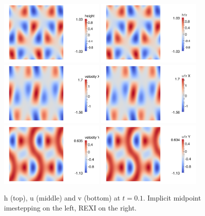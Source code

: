 \documentclass[14pt]{article}
\begin{document}
\begin{figure}
  \centering
  \includegraphics[width=0.45\textwidth]{results/t0.1/IM_h}
  \includegraphics[width=0.45\textwidth]{results/t0.1/REXI_h}\\
  \includegraphics[width=0.45\textwidth]{results/t0.1/IM_u}
  \includegraphics[width=0.45\textwidth]{results/t0.1/REXI_u}\\
  \includegraphics[width=0.45\textwidth]{results/t0.1/IM_v}
  \includegraphics[width=0.45\textwidth]{results/t0.1/REXI_v}
\caption{h (top), u (middle) and v (bottom) at $t=0.1$. Implicit midpoint imestepping on the left, REXI on the right.}
\end{figure}
\end{document}
